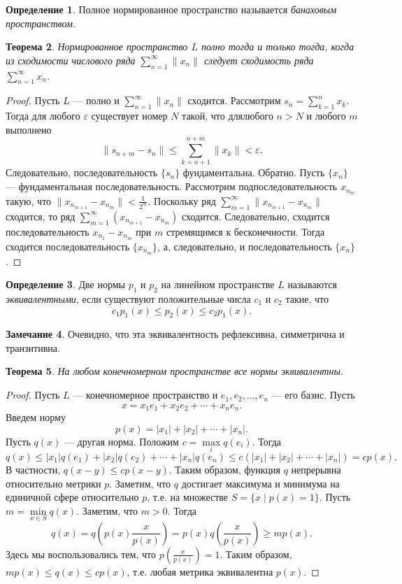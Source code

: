 \documentclass[12pt, titlepage, oneside]{amsbook}
\newtheorem{theorem}{Теорема}[chapter]
\theoremstyle{definition}
\newtheorem{definition}[theorem]{Определение}
\newtheorem{remark}[theorem]{Замечание}
\theoremstyle{remark}
\begin{document}
\begin{definition}
	Полное нормированное пространство называется \emph{банаховым пространством}.
\end{definition}

\begin{theorem}
	\label{Nor1}
	Нормированное пространство $L$ полно тогда и только тогда, когда из сходимости числового ряда $\sum\limits_{n=1}^{\infty}\|x_n\|$ следует сходимость ряда $\sum\limits_{n=1}^{\infty}x_n$.
\end{theorem}

\begin{proof}
	Пусть $L$ --- полно и $\sum\limits_{n=1}^{\infty}\|x_n\|$ сходится. Рассмотрим $s_n=\sum\limits_{k=1}^{n}x_k$. Тогда для любого $\varepsilon$ существует номер $N$ такой, что длялюбого $n>N$ и любого $m$ выполнено $$\|s_{n+m}-s_n\|\leq\sum\limits_{k=n+1}^{n+m}\|x_k\|<\varepsilon.$$ Следовательно, последовательность $\{s_n\}$ фундаментальна. Обратно. Пусть $\{x_n\}$ --- фундаментальная последовательность. Рассмотрим подпоследовательность $x_{n_m}$ такую, что $\|x_{n_{m+1}}-x_{n_m}\|<\frac{1}{2^m}$. Поскольку ряд $\sum\limits_{m=1}^{\infty}\|x_{n_{m+1}}-x_{n_m}\|$ сходится, то ряд $\sum\limits_{m=1}^{\infty}(x_{n_{m+1}}-x_{n_m})$ сходится. Следовательно, сходится последовательность $x_{n_{1}}-x_{n_m}$ при $m$ стремящимся к бесконечности. Тогда сходится последовательность $\{x_{n_m}\}$, а, следовательно, и последовательность $\{x_n\}$.
\end{proof}

\begin{definition}
	Две нормы $p_1$ и $p_2$ на линейном пространстве $L$ называются \emph{эквивалентными}, если существуют положительные числа $c_1$ и $c_2$ такие, что $$c_1p_1(x)\leq p_2(x)\leq c_2p_1(x).$$
\end{definition}

\begin{remark}
	Очевидно, что эта эквивалентность рефлексивна, симметрична и транзитивна.
\end{remark}

\begin{theorem}
	\label{Nor2}
	На любом конечномерном пространстве все нормы эквивалентны.
\end{theorem}

\begin{proof}
	Пусть $L$ --- конечномерное пространство и $e_1,e_2,\ldots, e_n$ --- его базис. Пусть $$x=x_1e_1+x_2e_2+\cdots+x_ne_n.$$ Введем норму $$p(x)=|x_1|+|x_2|+\cdots+|x_n|.$$ Пусть $q(x)$ --- другая норма. Положим $c=\max\limits_i q(e_i)$. Тогда $$q(x)\leq |x_1|q(e_1)+|x_2|q(e_2)+\cdots+|x_n|q(e_n)\leq c(|x_1|+|x_2|+\cdots+|x_n|)=cp(x).$$ В частности, $q(x-y)\leq cp(x-y)$. Таким образом, функция $q$ непрерывна относительно метрики $p$. Заметим, что $q$ достигает максимума и минимума на единичной сфере относительно $p$, т.е. на множестве $S=\{x\mid p(x)=1\}$. Пусть $m=\min\limits_{x\in S}q(x)$. Заметим, что $m>0$. Тогда $$q(x)=q\left(p(x)\frac{x}{p(x)}\right)=p(x)q\left(\frac{x}{p(x)}\right)\geq mp(x).$$ Здесь мы воспользовались тем, что $p(\frac{x}{p(x)})=1$. Таким образом, $mp(x)\leq q(x)\leq cp(x)$, т.е. любая метрика эквивалентна $p(x)$.
\end{proof}
\end{document}
